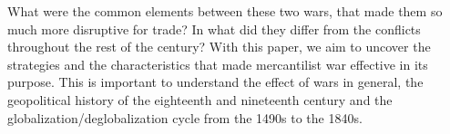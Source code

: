 \documentclass[12pt,a4paper,notitlepage,english]{article}
\newcommand{\source}[1]{\caption*{\footnotesize Source: {#1}} }
\begin{document}
What were the common elements between these two wars, that made them so much more disruptive for trade? In what did they differ from the conflicts throughout the rest of the century? With this paper, we aim to uncover the strategies and the characteristics that made mercantilist war effective in its purpose.
This is important to understand the effect of wars in general, the geopolitical history of the eighteenth and nineteenth century and the globalization/deglobalization cycle from the 1490s to the 1840s.
\end{document}

